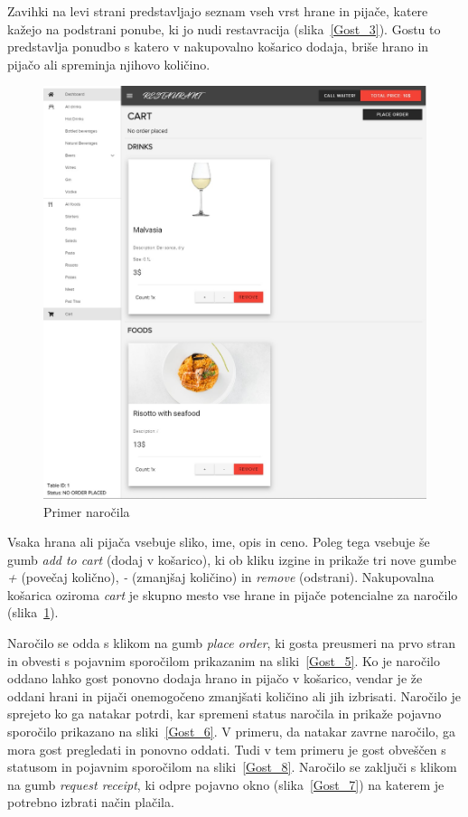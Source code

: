 \documentclass[a4paper, 12pt]{book}
\begin{document}
Zavihki na levi strani predstavljajo seznam vseh vrst hrane in pijače, katere kažejo na podstrani ponube, ki jo nudi restavracija (slika~\ref{Gost_3}). Gostu to predstavlja ponudbo s katero v nakupovalno košarico dodaja, briše hrano in pijačo ali spreminja njihovo količino.
\begin{figure}[!htb]
\begin{center}
\includegraphics[width=12cm]{gost_4.jpg}
\caption{Primer naročila}
\label{Gost_4}
\end{center}
\end{figure}
 
Vsaka hrana ali pijača vsebuje sliko, ime, opis in ceno. Poleg tega vsebuje še gumb \textit{add to cart} (dodaj v košarico), ki ob kliku izgine in prikaže tri nove gumbe \textit{+} (povečaj količno), \textit{-} (zmanjšaj količino) in \textit{remove} (odstrani). Nakupovalna košarica oziroma \textit{cart} je skupno mesto vse hrane in pijače potencialne za naročilo (slika~\ref{Gost_4}).

Naročilo se odda s klikom na gumb \textit{place order}, ki gosta preusmeri na prvo stran in obvesti s pojavnim sporočilom prikazanim na sliki~\ref{Gost_5}. Ko je naročilo oddano lahko gost ponovno dodaja hrano in pijačo v košarico, vendar je že oddani hrani in pijači onemogočeno zmanjšati količino ali jih izbrisati. Naročilo je sprejeto ko ga natakar potrdi, kar spremeni status naročila in prikaže pojavno sporočilo prikazano na sliki~\ref{Gost_6}. V primeru, da natakar zavrne naročilo, ga mora gost pregledati in ponovno oddati. Tudi v tem primeru je gost obveščen s statusom in pojavnim sporočilom na sliki~\ref{Gost_8}. Naročilo se zaključi s klikom na gumb \textit{request receipt}, ki odpre pojavno okno (slika~\ref{Gost_7}) na katerem je potrebno izbrati način plačila.
\end{document}
